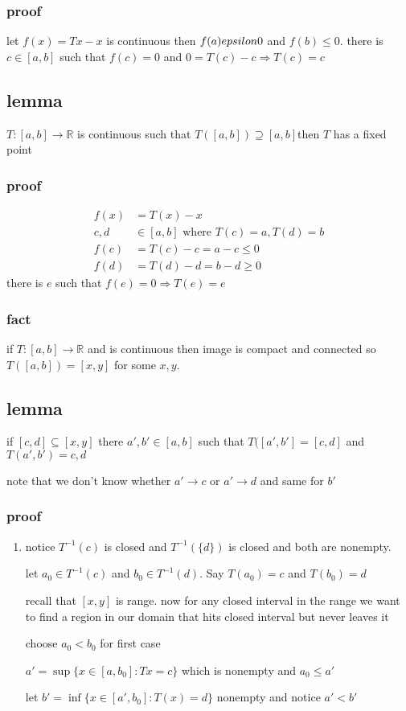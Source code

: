 \documentclass[letterpaper]{article}
\begin{document}
\subsubsection*{proof}
let $f(x)=Tx-x$ is continuous then $f(a)\\epsilon0$ and $f(b)\le 0$. there is $c\in [a,b]$ such that $f(c)=0$ and $0=T(c)-c\Rightarrow T(c)=c$

\subsection*{lemma}
$T:[a,b]\to\mathbb{R}$ is continuous such that $T([a,b])\supseteq [a,b]$then $T$ has a fixed point

\subsubsection*{proof}
\begin{align*}
  f(x)&=T(x)-x\\
  c,d&\in[a,b] \text{ where } T(c)=a,T(d)=b\\
  f(c)&=T(c)-c=a-c\le 0\\
  f(d)&=T(d)-d=b-d\ge 0
\end{align*}
there is $e$ such that $f(e)=0\Rightarrow T(e)=e$

\subsubsection*{fact}
if $T:[a,b]\to \mathbb{R}$ and is continuous then image is compact and connected so $T([a,b])=[x,y]$ for some $x,y$.

\subsection*{lemma}
if $[c,d]\subseteq[x,y]$ there $a',b'\in[a,b]$ such that $T([a',b']=[c,d]$ and $T({a',b'})={c,d}$

note that we don't know whether $a'\to c$ or $a'\to d$ and same for $b'$

\subsubsection*{proof}
\begin{enumerate}
\item
notice $T^{-1}({c})$ is closed and $T^{-1}(\{d\})$ is closed and both are nonempty.

let $a_0\in T^{-1}({c})$ and $b_0\in T^{-1}({d})$. Say $T(a_0)=c$ and $T(b_0)=d$

recall that $[x,y]$ is range. now for any closed interval in the range we want to find a region in our domain that hits closed interval but never leaves it

choose $a_0<b_0$ for first case

$a'=\sup \{x\in [a,b_0]:Tx=c\}$ which is nonempty and $a_0\le a'$

let $b'=\inf \{x\in [a',b_0]:T(x)=d\}$ nonempty and notice $a'<b'$
\end{enumerate}
\end{document}

